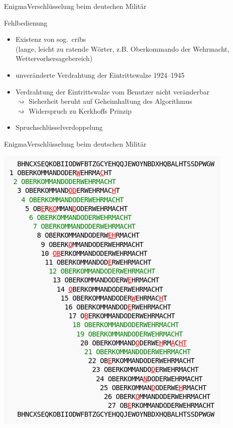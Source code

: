 \documentclass{beamer}
\theoremstyle{plain}
\begin{document}
 
 \begin{frame}{Enigma}{Verschlüsselung beim deutschen Militär} 
     \begin{block}{Fehlbedienung}
     \begin{itemize}
      \item Existenz von sog.~cribs \\
      (lange, leicht zu ratende Wörter, z.B. Oberkommando der Wehrmacht, Wettervorhersagebereich)
      \item unveränderte Verdrahtung der Eintrittswalze 1924--1945
      \item Verdrahtung der Eintrittswalze vom Benutzer nicht veränderbar \\
      $\rightsquigarrow$ Sicherheit beruht auf Geheimhaltung des Algorithmus\\
      $\rightsquigarrow$ Widerspruch zu Kerkhoffs Prinzip
      \item Spruchschlüsselverdoppelung
     \end{itemize}
    \end{block}

    
   \end{frame}

      \begin{frame}{Enigma}{Verschlüsselung beim deutschen Militär} 
      \begin{center}
       \includegraphics[height=0.8\textheight]{crib}
       \end{center}
      \end{frame}
\end{document}
